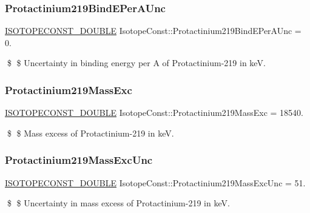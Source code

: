 \subsubsection{\texorpdfstring{Protactinium219\+Bind\+E\+Per\+A\+Unc}{Protactinium219BindEPerAUnc}}
{\footnotesize\ttfamily \mbox{\hyperlink{group___isotope_const-_macros_ga8f45a7272ce02c0b4c65c44636ed719a}{I\+S\+O\+T\+O\+P\+E\+C\+O\+N\+S\+T\+\_\+\+D\+O\+U\+B\+LE}} Isotope\+Const\+::\+Protactinium219\+Bind\+E\+Per\+A\+Unc = 0.}

\$ \$ Uncertainty in binding energy per A of Protactinium-\/219 in keV. \mbox{\label{group___isotope_const-_protactinium-_pa219_ga9656e92b59566980d2434fc4c978503e}} 
\subsubsection{\texorpdfstring{Protactinium219\+Mass\+Exc}{Protactinium219MassExc}}
{\footnotesize\ttfamily \mbox{\hyperlink{group___isotope_const-_macros_ga8f45a7272ce02c0b4c65c44636ed719a}{I\+S\+O\+T\+O\+P\+E\+C\+O\+N\+S\+T\+\_\+\+D\+O\+U\+B\+LE}} Isotope\+Const\+::\+Protactinium219\+Mass\+Exc = 18540.}

\$ \$ Mass excess of Protactinium-\/219 in keV. \mbox{\label{group___isotope_const-_protactinium-_pa219_ga070381417923fa8e6ca62cb45ee5d28f}} 
\subsubsection{\texorpdfstring{Protactinium219\+Mass\+Exc\+Unc}{Protactinium219MassExcUnc}}
{\footnotesize\ttfamily \mbox{\hyperlink{group___isotope_const-_macros_ga8f45a7272ce02c0b4c65c44636ed719a}{I\+S\+O\+T\+O\+P\+E\+C\+O\+N\+S\+T\+\_\+\+D\+O\+U\+B\+LE}} Isotope\+Const\+::\+Protactinium219\+Mass\+Exc\+Unc = 51.}

\$ \$ Uncertainty in mass excess of Protactinium-\/219 in keV. \mbox{\label{group___isotope_const-_protactinium-_pa219_gae17ed0a9dd46cbaa41c610d4b214b553}} 
